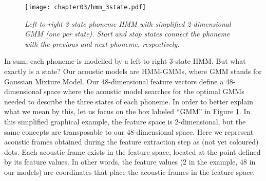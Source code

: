 \begin{figure}[htb]
\centering
\texttt{[image: chapter03/hmm\_3state.pdf]}
\caption{\textit{Left-to-right 3-state phoneme HMM with simplified 2-dimensional GMM (one per state). Start and stop states connect the phoneme with the previous and next phoneme, respectively.}}
\label{fig:hmm_3state}
\end{figure}

In sum, each phoneme is modelled by a left-to-right 3-state HMM. But what exactly is a state? Our acoustic models are HMM-GMMs, where GMM stands for Gaussian Mixture Model. Our 48-dimensional feature vectors define a 48-dimensional space where the acoustic model searches for the optimal GMMs needed to describe the three states of each phoneme. In order to better explain what we mean by this, let us focus on the box labeled ``GMM'' in Figure \ref{fig:hmm_3state}. In this simplified graphical example, the feature space is 2-dimensional, but the same concepts are transposable to our 48-dimensional space.
Here we represent acoustic frames obtained during the feature extraction step as (not yet coloured) dots. Each acoustic frame exists in the feature space, located at the point defined by its feature values. In other words, the feature values (2 in the example, 48 in our models) are coordinates that place the acoustic frames in the feature space.

